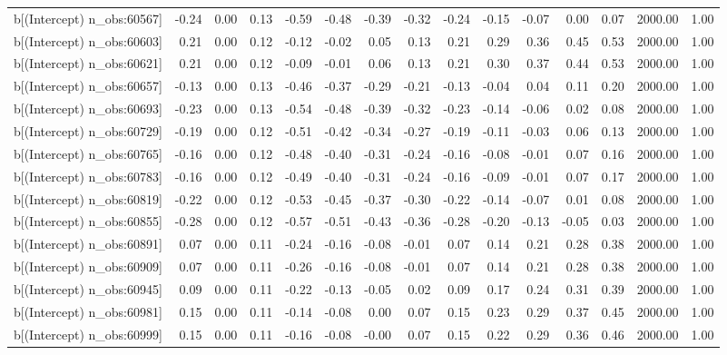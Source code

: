 \begin{table}[ht]
\begin{tabular}{rrrrrrrrrrrrrrr}
  b[(Intercept) n\_obs:60567] & -0.24 & 0.00 & 0.13 & -0.59 & -0.48 & -0.39 & -0.32 & -0.24 & -0.15 & -0.07 & 0.00 & 0.07 & 2000.00 & 1.00 \\ 
  b[(Intercept) n\_obs:60603] & 0.21 & 0.00 & 0.12 & -0.12 & -0.02 & 0.05 & 0.13 & 0.21 & 0.29 & 0.36 & 0.45 & 0.53 & 2000.00 & 1.00 \\ 
  b[(Intercept) n\_obs:60621] & 0.21 & 0.00 & 0.12 & -0.09 & -0.01 & 0.06 & 0.13 & 0.21 & 0.30 & 0.37 & 0.44 & 0.53 & 2000.00 & 1.00 \\ 
  b[(Intercept) n\_obs:60657] & -0.13 & 0.00 & 0.13 & -0.46 & -0.37 & -0.29 & -0.21 & -0.13 & -0.04 & 0.04 & 0.11 & 0.20 & 2000.00 & 1.00 \\ 
  b[(Intercept) n\_obs:60693] & -0.23 & 0.00 & 0.13 & -0.54 & -0.48 & -0.39 & -0.32 & -0.23 & -0.14 & -0.06 & 0.02 & 0.08 & 2000.00 & 1.00 \\ 
  b[(Intercept) n\_obs:60729] & -0.19 & 0.00 & 0.12 & -0.51 & -0.42 & -0.34 & -0.27 & -0.19 & -0.11 & -0.03 & 0.06 & 0.13 & 2000.00 & 1.00 \\ 
  b[(Intercept) n\_obs:60765] & -0.16 & 0.00 & 0.12 & -0.48 & -0.40 & -0.31 & -0.24 & -0.16 & -0.08 & -0.01 & 0.07 & 0.16 & 2000.00 & 1.00 \\ 
  b[(Intercept) n\_obs:60783] & -0.16 & 0.00 & 0.12 & -0.49 & -0.40 & -0.31 & -0.24 & -0.16 & -0.09 & -0.01 & 0.07 & 0.17 & 2000.00 & 1.00 \\ 
  b[(Intercept) n\_obs:60819] & -0.22 & 0.00 & 0.12 & -0.53 & -0.45 & -0.37 & -0.30 & -0.22 & -0.14 & -0.07 & 0.01 & 0.08 & 2000.00 & 1.00 \\ 
  b[(Intercept) n\_obs:60855] & -0.28 & 0.00 & 0.12 & -0.57 & -0.51 & -0.43 & -0.36 & -0.28 & -0.20 & -0.13 & -0.05 & 0.03 & 2000.00 & 1.00 \\ 
  b[(Intercept) n\_obs:60891] & 0.07 & 0.00 & 0.11 & -0.24 & -0.16 & -0.08 & -0.01 & 0.07 & 0.14 & 0.21 & 0.28 & 0.38 & 2000.00 & 1.00 \\ 
  b[(Intercept) n\_obs:60909] & 0.07 & 0.00 & 0.11 & -0.26 & -0.16 & -0.08 & -0.01 & 0.07 & 0.14 & 0.21 & 0.28 & 0.38 & 2000.00 & 1.00 \\ 
  b[(Intercept) n\_obs:60945] & 0.09 & 0.00 & 0.11 & -0.22 & -0.13 & -0.05 & 0.02 & 0.09 & 0.17 & 0.24 & 0.31 & 0.39 & 2000.00 & 1.00 \\ 
  b[(Intercept) n\_obs:60981] & 0.15 & 0.00 & 0.11 & -0.14 & -0.08 & 0.00 & 0.07 & 0.15 & 0.23 & 0.29 & 0.37 & 0.45 & 2000.00 & 1.00 \\ 
  b[(Intercept) n\_obs:60999] & 0.15 & 0.00 & 0.11 & -0.16 & -0.08 & -0.00 & 0.07 & 0.15 & 0.22 & 0.29 & 0.36 & 0.46 & 2000.00 & 1.00 \\ 

\end{tabular}
\end{table}
